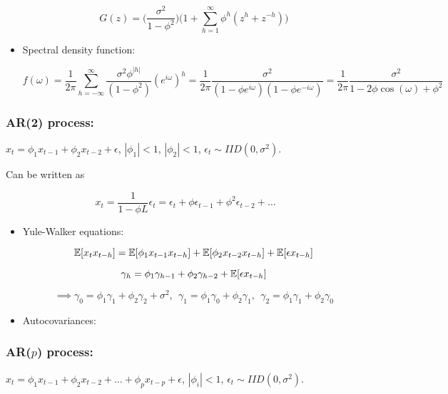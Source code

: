 \begin{itemize}
\[
G(z) = \bigg( \frac{\sigma^2}{1 - \phi ^2} \bigg) \bigg( 1 + \sum_{h=1}^\infty \phi^h(z^h + z^{-h}) \bigg)
\]


\item Spectral density function: 

\[
f(\omega) = \frac{1}{2\pi} \sum_{h=-\infty}^\infty \frac{\sigma^2 \phi^{|h|}}{(1 - \phi^2)} (e^{i \omega})^h = \frac{1}{2\pi} \frac{\sigma^2}{(1 - \phi e^{i \omega})(1 - \phi e^{- i \omega})} = \frac{1}{2 \pi} \frac{\sigma^2}{1 - 2 \phi \cos(\omega) + \phi^2}
\]


\end{itemize}


\subsubsection{AR(2) process:} \(x_t = \phi_1x_{t-1} + \phi_2x_{t-2} + \epsilon\), \(|\phi_1| < 1\), \(|\phi_2| < 1\), \(\epsilon_t \sim IID(0, \sigma^2)\). 

Can be written as 

\[
x_t = \frac{1}{1 - \phi L} \epsilon_t = \epsilon_t + \phi \epsilon_{t-1} + \phi^2 \epsilon_{t-2} + \ldots
\]

\begin{itemize}

\item Yule-Walker equations:

\[
\mathbb{E}[x_tx_{t-h} ]= \mathbb{E}[ \phi_1x_{t-1}x_{t-h}] +\mathbb{E}[ \phi_2x_{t-2}x_{t-h}] + \mathbb{E}[ \epsilon x_{t-h}]
\]

\[
\gamma_h = \phi_1 \gamma_{h-1} + \phi_2 \gamma_{h-2} + \mathbb{E}[ \epsilon x_{t-h}]
\]

\[
\implies \boxed{ \gamma_0 = \phi_1 \gamma_1 + \phi_2 \gamma_2 +\sigma^2,  \ \ \gamma_1 = \phi_1 \gamma_{0} + \phi_2 \gamma_{1}, \ \ \gamma_2 = \phi_1 \gamma_{1} + \phi_2 \gamma_{0}  }
\]

\item Autocovariances:

\end{itemize}


\subsubsection{AR(\(p\)) process:} \(x_t = \phi_1x_{t-1} + \phi_2x_{t-2} + \ldots + \phi_p x_{t-p} + \epsilon\), \(|\phi_i| < 1\), \(\epsilon_t \sim IID(0, \sigma^2)\). 

